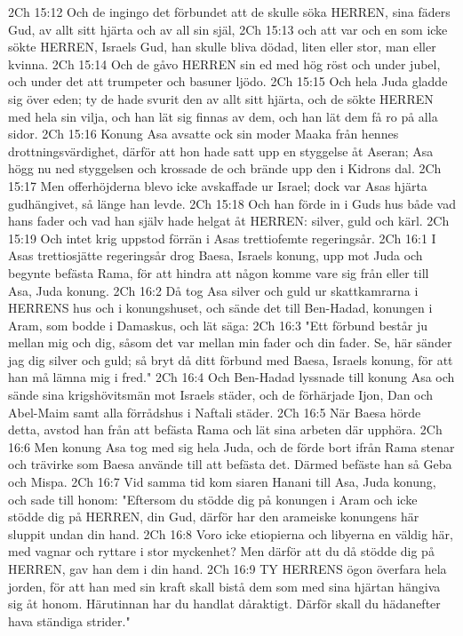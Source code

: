2Ch 15:12  Och de ingingo det förbundet att de skulle söka HERREN, sina fäders Gud, av allt sitt hjärta och av all sin själ,
2Ch 15:13  och att var och en som icke sökte HERREN, Israels Gud, han skulle bliva dödad, liten eller stor, man eller kvinna.
2Ch 15:14  Och de gåvo HERREN sin ed med hög röst och under jubel, och under det att trumpeter och basuner ljödo.
2Ch 15:15  Och hela Juda gladde sig över eden; ty de hade svurit den av allt sitt hjärta, och de sökte HERREN med hela sin vilja, och han lät sig finnas av dem, och han lät dem få ro på alla sidor.
2Ch 15:16  Konung Asa avsatte ock sin moder Maaka från hennes drottningsvärdighet, därför att hon hade satt upp en styggelse åt Aseran; Asa högg nu ned styggelsen och krossade de och brände upp den i Kidrons dal.
2Ch 15:17  Men offerhöjderna blevo icke avskaffade ur Israel; dock var Asas hjärta gudhängivet, så länge han levde.
2Ch 15:18  Och han förde in i Guds hus både vad hans fader och vad han själv hade helgat åt HERREN: silver, guld och kärl.
2Ch 15:19  Och intet krig uppstod förrän i Asas trettiofemte regeringsår.
2Ch 16:1  I Asas trettiosjätte regeringsår drog Baesa, Israels konung, upp mot Juda och begynte befästa Rama, för att hindra att någon komme vare sig från eller till Asa, Juda konung.
2Ch 16:2  Då tog Asa silver och guld ur skattkamrarna i HERRENS hus och i konungshuset, och sände det till Ben-Hadad, konungen i Aram, som bodde i Damaskus, och lät säga:
2Ch 16:3  "Ett förbund består ju mellan mig och dig, såsom det var mellan min fader och din fader. Se, här sänder jag dig silver och guld; så bryt då ditt förbund med Baesa, Israels konung, för att han må lämna mig i fred."
2Ch 16:4  Och Ben-Hadad lyssnade till konung Asa och sände sina krigshövitsmän mot Israels städer, och de förhärjade Ijon, Dan och Abel-Maim samt alla förrådshus i Naftali städer.
2Ch 16:5  När Baesa hörde detta, avstod han från att befästa Rama och lät sina arbeten där upphöra.
2Ch 16:6  Men konung Asa tog med sig hela Juda, och de förde bort ifrån Rama stenar och trävirke som Baesa använde till att befästa det. Därmed befäste han så Geba och Mispa.
2Ch 16:7  Vid samma tid kom siaren Hanani till Asa, Juda konung, och sade till honom: "Eftersom du stödde dig på konungen i Aram och icke stödde dig på HERREN, din Gud, därför har den arameiske konungens här sluppit undan din hand.
2Ch 16:8  Voro icke etiopierna och libyerna en väldig här, med vagnar och ryttare i stor myckenhet? Men därför att du då stödde dig på HERREN, gav han dem i din hand.
2Ch 16:9  TY HERRENS ögon överfara hela jorden, för att han med sin kraft skall bistå dem som med sina hjärtan hängiva sig åt honom. Härutinnan har du handlat dåraktigt. Därför skall du hädanefter hava ständiga strider."
